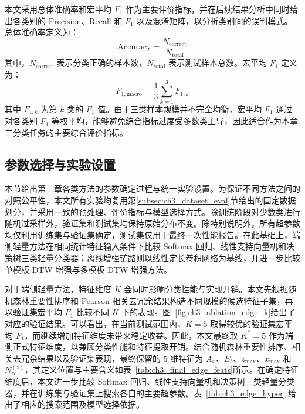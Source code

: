 \documentclass{xdupgthesis}
\providecommand{\FloatBarrier}{}
\begin{document}
本文采用总体准确率和宏平均 $F_1$ 作为主要评价指标，并在后续结果分析中同时给出各类别的 Precision、Recall 和 $F_1$ 以及混淆矩阵，以分析类别间的误判模式。总体准确率定义为：
\begin{equation}
    \mathrm{Accuracy}=\frac{N_{\mathrm{correct}}}{N_{\mathrm{total}}}
\end{equation}
其中，$N_{\mathrm{correct}}$ 表示分类正确的样本数，$N_{\mathrm{total}}$ 表示测试样本总数。宏平均 $F_1$ 定义为：
\begin{equation}
    F_{1,\mathrm{macro}}=\frac{1}{3}\sum_{k=1}^{3}F_{1,k}
\end{equation}
其中 $F_{1,k}$ 为第 $k$ 类的 $F_1$ 值。由于三类样本规模并不完全均衡，宏平均 $F_1$ 通过对各类别 $F_1$ 等权平均，能够避免综合指标过度受多数类主导，因此适合作为本章三分类任务的主要综合评价指标。

\FloatBarrier

\subsection{参数选择与实验设置}
\label{subsec:ch3_param_setup}

本节给出第三章各类方法的参数确定过程与统一实验设置。为保证不同方法之间的对照公平性，本文所有实验均复用第\ref{subsec:ch3_dataset_eval}节给出的固定数据划分，并采用一致的预处理、评价指标与模型选择方式。除训练阶段对少数类进行随机过采样外，验证集和测试集均保持原始分布不变。除特别说明外，所有超参数均仅利用训练集与验证集确定，测试集仅用于最终一次性能报告。在此基础上，端侧轻量方法在相同统计特征输入条件下比较 Softmax 回归、线性支持向量机和决策树三类轻量分类器；离线增强链路则以线性定长卷积网络为基线，并进一步比较单模板 DTW 增强与多模板 DTW 增强方法。

对于端侧轻量方法，特征维度 $K$ 会同时影响分类性能与实现开销。本文先根据随机森林重要性排序和 Pearson 相关去冗余结果构造不同规模的候选特征子集，再以验证集宏平均 $F_1$ 比较不同 $K$ 下的表现。图~\ref{fig:ch3_ablation_edge_k}给出了对应的验证结果。可以看出，在当前测试范围内，$K=5$ 取得较优的验证集宏平均 $F_1$，而继续增加特征维度未带来稳定收益。因此，本文最终取 $K^\ast=5$ 作为端侧正式特征维度，以兼顾分类性能和特征提取开销。结合随机森林重要性排序、相关去冗余结果以及验证集表现，最终保留的 5 维特征为 $A_x$、$E_b$、$z_{\max}$、$x_{\max}$ 和 $N_{zc}^{(z)}$，其定义位置与主要含义如表~\ref{tab:ch3_final_edge_feats}所示。在确定特征维度后，本文进一步比较 Softmax 回归、线性支持向量机和决策树三类轻量分类器，并在训练集与验证集上搜索各自的主要超参数。表~\ref{tab:ch3_edge_hyper} 给出了相应的搜索范围及模型选择依据。
\end{document}
